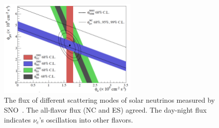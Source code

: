 \begin{figure}[h!]
\centering
\includegraphics[width=0.6\textwidth]{Figures/sno.png}
\caption[Solar neutrino oscillation]{The flux of different scattering modes of solar neutrinos measured by SNO~\cite{bib:SNO}. The all-flavor flux (NC and ES) agreed. The day-night flux indicates $\nu_e$'s oscillation into other flavors. }
\label{fig:sno}
\end{figure}

    

